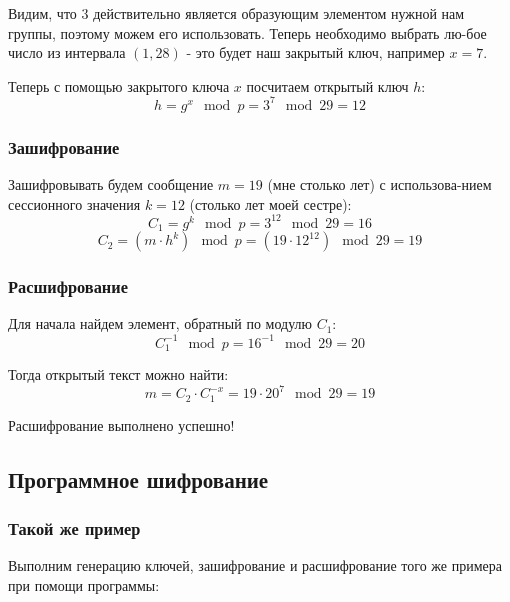 \documentclass[a4paper]{article}
\begin{document}
  Видим, что $3$ действительно является образующим элементом нужной нам группы, поэтому можем его использовать.
  Теперь необходимо выбрать лю-бое число из интервала $\left(1, 28\right)$ - это будет наш
  закрытый ключ, например $x = 7$.

  Теперь с помощью закрытого ключа $x$ посчитаем открытый ключ $h$:
  \begin{equation}
    h = g^x\mod{p} = 3^7\mod{29} = 12
  \end{equation}

  \subsubsection{Зашифрование}

  Зашифровывать будем сообщение $m = 19$ (мне столько лет) с использова-нием сессионного 
  значения $k = 12$ (столько лет моей сестре):
  \begin{equation}
    C_1 = g^k\mod{p} = 3^{12}\mod{29} = 16
  \end{equation}
  \begin{equation}
    C_2 = (m\cdot{h^k})\mod{p} = (19\cdot{12^{12}})\mod{29} = 19
  \end{equation}

  \subsubsection{Расшифрование}

  Для начала найдем элемент, обратный по модулю $C_1$:
  \begin{equation}
    C^{-1}_1\mod{p} = 16^{-1}\mod{29} = 20
  \end{equation}

  Тогда открытый текст можно найти:
  \begin{equation}
    m = C_2\cdot{C^{-x}_1} = 19 \cdot{20^{7}} \mod{29} = 19
  \end{equation}

  Расшифрование выполнено успешно!

  \subsection{Программное шифрование}

  \subsubsection{Такой же пример}

  Выполним генерацию ключей, зашифрование и расшифрование того же
  примера при помощи программы:
\end{document}
